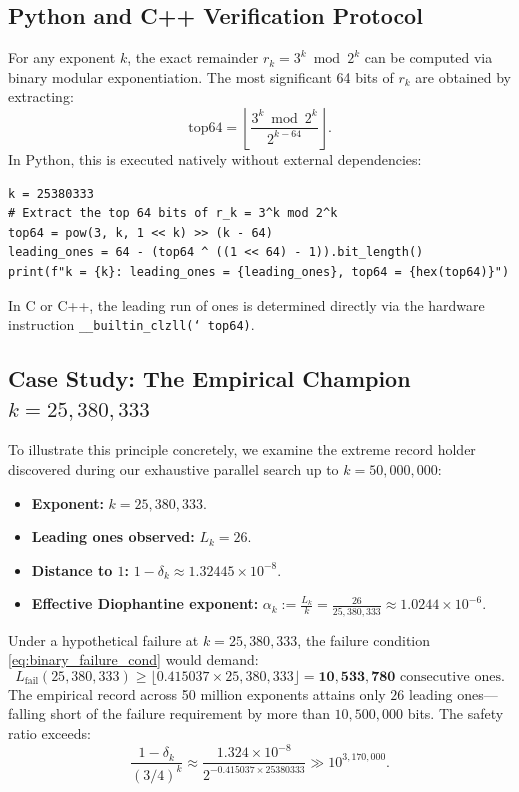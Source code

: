\documentclass[11pt,reqno]{amsart}
\theoremstyle{definition}
\numberwithin{equation}{section}
\begin{document}
\subsection{Python and C++ Verification Protocol}
For any exponent $k$, the exact remainder $r_k = 3^k \bmod 2^k$ can be computed via binary modular exponentiation. The most significant 64 bits of $r_k$ are obtained by extracting:
\begin{equation}\label{eq:top64_def}
\mathrm{top64} = \left\lfloor \frac{3^k \bmod 2^k}{2^{k - 64}} \right\rfloor.
\end{equation}
In Python, this is executed natively without external dependencies:
\begin{verbatim}
k = 25380333
# Extract the top 64 bits of r_k = 3^k mod 2^k
top64 = pow(3, k, 1 << k) >> (k - 64)
leading_ones = 64 - (top64 ^ ((1 << 64) - 1)).bit_length()
print(f"k = {k}: leading_ones = {leading_ones}, top64 = {hex(top64)}")
\end{verbatim}
In C or C++, the leading run of ones is determined directly via the hardware instruction \texttt{\_\_builtin\_clzll(\char`~top64)}.

\subsection{Case Study: The Empirical Champion \texorpdfstring{$k = 25{,}380{,}333$}{k = 25380333}}
To illustrate this principle concretely, we examine the extreme record holder discovered during our exhaustive parallel search up to $k = 50{,}000{,}000$:
\begin{itemize}
    \item \textbf{Exponent:} $k = 25{,}380{,}333$.
    \item \textbf{Leading ones observed:} $L_k = 26$.
    \item \textbf{Distance to $1$:} $1 - \delta_k \approx 1.32445 \times 10^{-8}$.
    \item \textbf{Effective Diophantine exponent:} $\alpha_k := \frac{L_k}{k} = \frac{26}{25{,}380{,}333} \approx 1.0244 \times 10^{-6}$.
\end{itemize}
Under a hypothetical failure at $k = 25{,}380{,}333$, the failure condition \eqref{eq:binary_failure_cond} would demand:
\begin{equation}
L_{\mathrm{fail}}(25{,}380{,}333) \ge \lfloor 0.415037 \times 25{,}380{,}333 \rfloor = \mathbf{10{,}533{,}780} \text{ consecutive ones}.
\end{equation}
The empirical record across 50 million exponents attains only $26$ leading ones---falling short of the failure requirement by more than $10{,}500{,}000$ bits. The safety ratio exceeds:
\begin{equation}
\frac{1 - \delta_k}{(3/4)^k} \approx \frac{1.324 \times 10^{-8}}{2^{-0.415037 \times 25380333}} \gg 10^{3{,}170{,}000}.
\end{equation}
\end{document}

